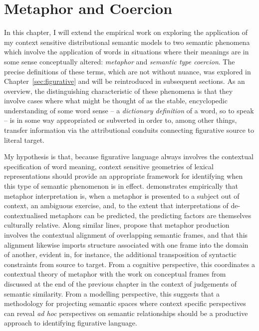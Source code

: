 \chapter{Metaphor and Coercion} \label{chap:figurative}
In this chapter, I will extend the empirical work on exploring the application of my context sensitive distributional semantic models to two semantic phenomena which involve the application of words in situations where their meanings are in some sense conceptually altered: \emph{metaphor} and \emph{semantic type coercion}.  The precise definitions of these terms, which are not without nuance, was explored in Chapter~\ref{sec:figurative} and will be reintroduced in subsequent sections.  As an overview, the distinguishing characteristic of these phenomena is that they involve cases where what might be thought of as the stable, encyclopedic understanding of some word sense -- a \emph{dictionary definition} of a word, so to speak -- is in some way appropriated or subverted in order to, among other things, transfer information via the attributional conduits connecting figurative source to literal target.

My hypothesis is that, because figurative language always involves the contextual specification of word meaning, context sensitive geometries of lexical representations should provide an appropriate framework for identifying when this type of semantic phenomenon is in effect.  \cite{Fraser1993} demonstrates empirically that metaphor interpretation is, when a metaphor is presented to a subject out of context, an ambiguous exercise, and, to the extent that interpretations of de-contextualised metaphors can be predicted, the predicting factors are themselves culturally relative.  Along similar lines, \cite{BouveretEA2009} propose that metaphor production involves the contextual alignment of overlapping semantic frames, and that this alignment likewise imports structure associated with one frame into the domain of another, evident in, for instance, the additional transposition of syntactic constraints from source to target.  From a cognitive perspective, this coordinates a contextual theory of metaphor with the work on conceptual frames from \cite{Barsalou1992,Barsalou1993} discussed at the end of the previous chapter in the context of judgements of semantic similarity.  From a modelling perspective, this suggests that a methodology for projecting semantic spaces where context specific perspectives can reveal \emph{ad hoc} perspectives on semantic relationships should be a productive approach to identifying figurative language.

